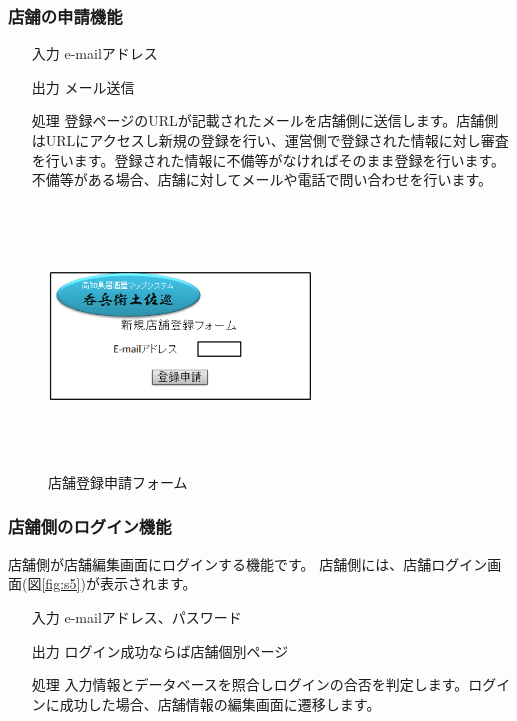 \documentclass[a4j,titlepage]{jarticle}
\begin{document}
\subsubsection{店舗の申請機能}
\begin{enumerate}
\item[入力] e-mailアドレス
\item[出力] メール送信
\item[処理] 登録ページのURLが記載されたメールを店舗側に送信します。店舗側はURLにアクセスし新規の登録を行い、運営側で登録された情報に対し審査を行います。登録された情報に不備等がなければそのまま登録を行います。不備等がある場合、店舗に対してメールや電話で問い合わせを行います。
\end{enumerate}

\begin{figure}[htbp]
  \begin{center}
  \includegraphics [height=7cm, width=7cm]{extrnal1_design_document_image/s4.eps}
  \caption{店舗登録申請フォーム}
  \label {fig:s4}
  \end{center}
\end{figure}

\newpage
\subsubsection{店舗側のログイン機能}
店舗側が店舗編集画面にログインする機能です。
店舗側には、店舗ログイン画面(図\ref{fig:s5})が表示されます。

\begin{enumerate}
\item[入力] e-mailアドレス、パスワード
\item[出力] ログイン成功ならば店舗個別ページ
\item[処理] 入力情報とデータベースを照合しログインの合否を判定します。ログインに成功した場合、店舗情報の編集画面に遷移します。
\end{enumerate}
\end{document}
